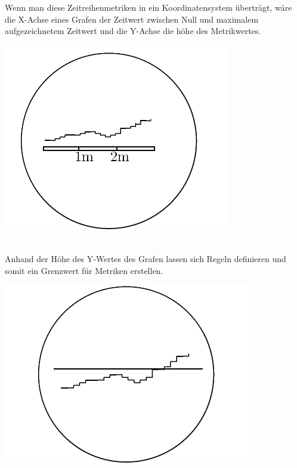 \documentclass[a4paper,10pt]{scrartcl}
\begin{document}
Wenn man diese Zeitreihenmetriken in ein Koordinatensystem überträgt, wäre die X-Achse eines Grafen der Zeitwert zwischen Null und maximalem aufgezeichnetem Zeitwert und die Y-Achse die höhe des Metrikwertes. \\

\begin{minipage}{\linewidth}
  \includegraphics[scale=.3]{img/Datenaggregation/GrafZeitNew.png} 
\end{minipage} \\


Anhand der Höhe des Y-Wertes des Grafen lassen sich Regeln definieren und somit ein Grenzwert für Metriken erstellen.\\

\begin{minipage}{\linewidth}
  \includegraphics[scale=.3]{img/Datenaggregation/GrafYWertNew.png} 
\end{minipage}\\
\end{document}
